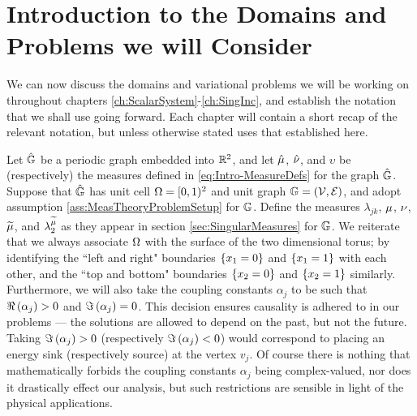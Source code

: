 \section{Introduction to the Domains and Problems we will Consider} \label{sec:TP-DomainSetup}
We can now discuss the domains and variational problems we will be working on throughout chapters \ref{ch:ScalarSystem}-\ref{ch:SingInc}, and establish the notation that we shall use going forward.
Each chapter will contain a short recap of the relevant notation, but unless otherwise stated uses that established here.

Let $\hat{\mathbb{G}}$ be a periodic graph embedded into $\mathbb{R}^2$, and let $\hat{\mu}$, $\hat{\nu}$, and $\upsilon$ be (respectively) the measures defined in \eqref{eq:Intro-MeasureDefs} for the graph $\hat{\mathbb{G}}$.
Suppose that $\hat{\mathbb{G}}$ has unit cell $\Omega=[0,1)^2$ and unit graph $\mathbb{G}=\left( \mathcal{V}, \mathcal{E} \right)$, and adopt assumption \ref{ass:MeasTheoryProblemSetup} for $\mathbb{G}$.
Define the measures $\lambda_{jk}$, $\mu$, $\nu$, $\widetilde{\mu}$, and $\lambda_2^{\widetilde{\mu}}$ as they appear in section \ref{sec:SingularMeasures} for $\mathbb{G}$.
We reiterate that we always associate $\Omega$ with the surface of the two dimensional torus; by identifying the ``left and right" boundaries $\left\{ x_1=0 \right\}$ and $\left\{ x_1=1 \right\}$ with each other, and the ``top and bottom" boundaries $\left\{ x_2=0 \right\}$ and $\left\{ x_2=1 \right\}$ similarly.
Furthermore, we will also take the coupling constants $\alpha_j$ to be such that $\Re\left( \alpha_j \right)>0$ and $\Im\left( \alpha_j \right) = 0$.
This decision ensures causality is adhered to in our problems --- the solutions are allowed to depend on the past, but not the future.
Taking $\Im\left( \alpha_j \right) > 0$ (respectively $\Im\left( \alpha_j \right) < 0$) would correspond to placing an energy sink (respectively source) at the vertex $v_j$.
Of course there is nothing that mathematically forbids the coupling constants $\alpha_j$ being complex-valued, nor does it drastically effect our analysis, but such restrictions are sensible in light of the physical applications. 

